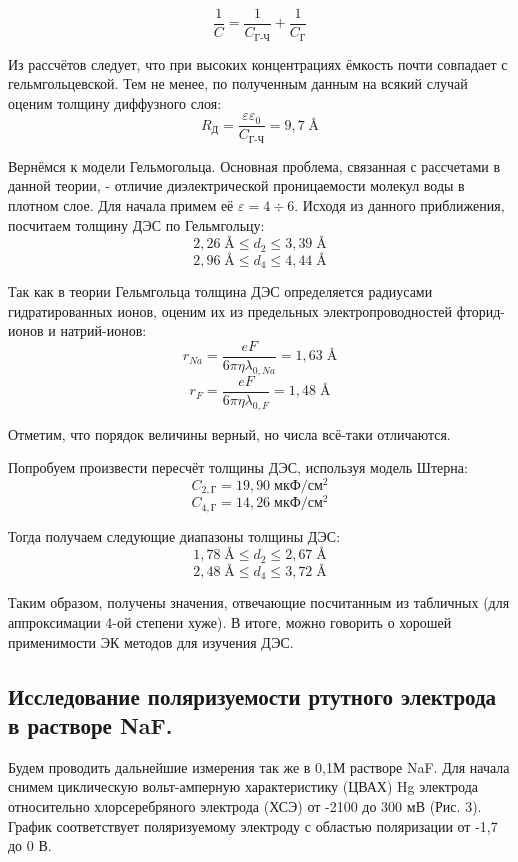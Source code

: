 \documentclass[a4paper, 11pt]{article}%
\begin{document}
$$\frac{1}{C} = \frac{1}{C_{\text{Г-Ч}}} + \frac{1}{C_{\text{Г}}}$$
\par Из рассчётов следует, что при высоких концентрациях ёмкость почти совпадает с гельмгольцевской. Тем не менее, по полученным данным на всякий случай оценим толщину диффузного слоя:
$$R_{\text{Д}} = \frac{\varepsilon \varepsilon_0}{C_{\text{Г-Ч}}} = 9,7 \; \si{\angstrom}$$
\par Вернёмся к модели Гельмогольца. Основная проблема, связанная с рассчетами в данной теории, - отличие диэлектрической проницаемости молекул воды в плотном слое. Для начала примем её $\varepsilon =  4 \div 6$. Исходя из данного приближения, посчитаем толщину ДЭС по Гельмгольцу:
$$ 2,26 \; \si{\angstrom} \leq d_2 \leq 3,39 \; \si{\angstrom}$$
$$ 2,96 \; \si{\angstrom} \leq d_4 \leq 4,44 \; \si{\angstrom}$$

\par Так как в теории Гельмгольца толщина ДЭС определяется радиусами гидратированных ионов, оценим их из предельных электропроводностей фторид-ионов и натрий-ионов:
$$r_{Na} = \frac{e F}{6 \pi \eta \lambda_{0,Na} } = 1,63 \; \si{\angstrom}$$
$$r_{F} = \frac{e F}{6 \pi \eta \lambda_{0,F} } = 1,48 \; \si{\angstrom}$$

\par Отметим, что порядок величины верный, но числа всё-таки отличаются. 
\par Попробуем произвести пересчёт толщины ДЭС, используя модель Штерна:
$$C_{2, \text{Г}} = 19,90 \; \text{мкФ}/\text{см}^2$$
$$C_{4, \text{Г}} = 14,26 \; \text{мкФ}/\text{см}^2$$
\par Тогда получаем следующие диапазоны толщины ДЭС:
$$1,78 \; \si{\angstrom} \leq d_2 \leq 2,67 \; \si{\angstrom}$$
$$2,48 \; \si{\angstrom} \leq d_4 \leq 3,72 \; \si{\angstrom}$$
\par Таким образом, получены значения, отвечающие посчитанным из табличных (для аппроксимации 4-ой степени хуже). В итоге, можно говорить о хорошей применимости ЭК методов для изучения ДЭС. 
\subsection{Исследование поляризуемости ртутного электрода в растворе NaF.}\;
\par Будем проводить дальнейшие измерения так же в 0,1М растворе NaF. Для начала снимем циклическую вольт-амперную характеристику (ЦВАХ) Hg электрода относительно хлорсеребряного электрода (ХСЭ) от -2100 до 300 мВ (Рис. 3). График соответствует поляризуемому электроду с областью поляризации от -1,7 до 0 В.
\end{document}
